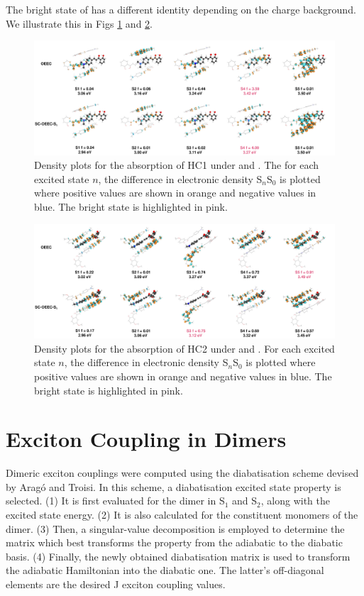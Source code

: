 The bright state of \HCC{} has a different identity depending on the charge background. We illustrate this in Figs \ref{fig:hc1abs} and \ref{fig:hc2abs}.

\begin{figure}[H]
\includegraphics[width=16cm]{Appendices/A/HC1abs_vertical.pdf}
\caption{Density plots for the absorption of HC1 under \EEC{} and \SCEEC{}. The for each excited state $n$, the difference in electronic density S$_n$\textendash{}S$_0$ is plotted where positive values are shown in orange and negative values in blue. The bright state is highlighted in pink.}
\label{fig:hc1abs}
\end{figure}

\begin{figure}[H]
\includegraphics[width=16cm]{Appendices/A/HC2abs_vertical.pdf}
\caption{Density plots for the absorption of HC2 under \EEC{} and \SCEEC{}. For each excited state $n$, the difference in electronic density S$_n$\textendash{}S$_0$ is plotted where positive values are shown in orange and negative values in blue. The bright state is highlighted in pink.}
\label{fig:hc2abs}
\end{figure}

\section{Exciton Coupling in Dimers}
\label{app:sec:troisi_J}


Dimeric exciton couplings were computed using the diabatisation scheme devised by Aragó and Troisi.\cite{Arag2015} In this scheme, a diabatisation excited state property is selected. (1) It is first evaluated for the dimer in S$_1$ and S$_2$, along with the excited state energy. (2) It is also calculated for the constituent monomers of the dimer. (3) Then, a singular-value decomposition is employed to determine the matrix which best transforms the property from the adiabatic to the diabatic basis. (4) Finally, the newly obtained diabatisation matrix is used to transform the adiabatic Hamiltonian into the diabatic one. The latter's off-diagonal elements are the desired J exciton coupling values. 

